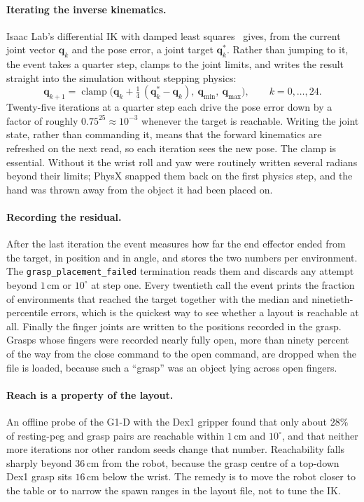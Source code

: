 \documentclass{article}
\newcommand{\code}[1]{\texttt{#1}}
\newcommand{\clamp}{\operatorname{clamp}}
\begin{document}
\paragraph{Iterating the inverse kinematics.}
Isaac Lab's differential IK with damped least squares~\cite{buss2004introduction,lynch2017modern} gives, from the current joint vector $\bm q_k$ and the pose error, a joint target $\bm q^{*}_k$. Rather than jumping to it, the event takes a quarter step, clamps to the joint limits, and writes the result straight into the simulation without stepping physics:
\begin{equation}
  \bm q_{k+1} = \clamp\!\Big(\bm q_k + \tfrac14\,(\bm q^{*}_k-\bm q_k),\ \bm q_{\min},\ \bm q_{\max}\Big), \qquad k=0,\dots,24 .
  \label{eq:ik}
\end{equation}
Twenty-five iterations at a quarter step each drive the pose error down by a factor of roughly $0.75^{25}\approx10^{-3}$ whenever the target is reachable. Writing the joint state, rather than commanding it, means that the forward kinematics are refreshed on the next read, so each iteration sees the new pose. The clamp is essential. Without it the wrist roll and yaw were routinely written several radians beyond their limits; PhysX snapped them back on the first physics step, and the hand was thrown away from the object it had been placed on.

\paragraph{Recording the residual.}
After the last iteration the event measures how far the end effector ended from the target, in position and in angle, and stores the two numbers per environment. The \code{grasp\_placement\_failed} termination reads them and discards any attempt beyond $1$\,cm or $10^\circ$ at step one. Every twentieth call the event prints the fraction of environments that reached the target together with the median and ninetieth-percentile errors, which is the quickest way to see whether a layout is reachable at all. Finally the finger joints are written to the positions recorded in the grasp. Grasps whose fingers were recorded nearly fully open, more than ninety percent of the way from the close command to the open command, are dropped when the file is loaded, because such a ``grasp'' was an object lying across open fingers.

\paragraph{Reach is a property of the layout.}
An offline probe of the G1-D with the Dex1 gripper found that only about $28\%$ of resting-peg and grasp pairs are reachable within $1$\,cm and $10^\circ$, and that neither more iterations nor other random seeds change that number. Reachability falls sharply beyond $36$\,cm from the robot, because the grasp centre of a top-down Dex1 grasp sits $16$\,cm below the wrist. The remedy is to move the robot closer to the table or to narrow the spawn ranges in the layout file, not to tune the IK.
\end{document}
